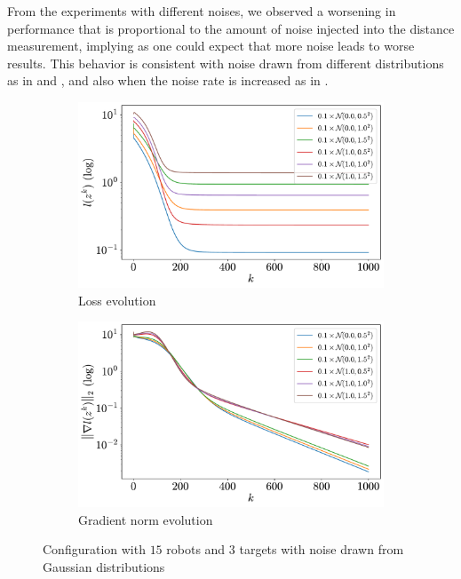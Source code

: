 \documentclass[a4paper,11pt,oneside]{book}
\begin{document}
From the experiments with different noises, we observed a worsening in performance that is proportional to the amount of noise injected into the distance measurement, implying as one could expect that more noise leads to worse results. This behavior is consistent with noise drawn from different distributions as in  and , and also when the noise rate is increased as in .

\begin{figure}[ht]
      \centering
      \begin{subfigure}[t]{0.49\textwidth}
            \centering
            \includegraphics[width=\linewidth]{./figs/tracking/loss_gaussian_15_3_2_1000.pdf} 
            \caption{Loss evolution}
      \end{subfigure}
      \hfill
      \begin{subfigure}[t]{0.49\textwidth}
            \centering
            \includegraphics[width=\linewidth]{./figs/tracking/gradient_gaussian_15_3_2_1000.pdf} 
            \caption{Gradient norm evolution}
      \end{subfigure}
      \caption{Configuration with $15$ robots and $3$ targets with noise drawn from Gaussian distributions}
      \label{fig:tracking_gaussian_15_3}
\end{figure}
\end{document}
